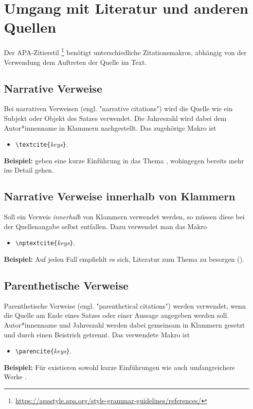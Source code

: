 \chapter[Umgang mit Literatur]{Umgang mit Literatur und anderen Quellen}
\label{cha:Literatur}

Der APA-Zitierstil%
\footnote{\url{https://apastyle.apa.org/style-grammar-guidelines/references/}}
benötigt unterschiedliche Zitationsmakros, abhängig von der Verwendung \bzw dem Auftreten der Quelle im Text.

\section{Narrative Verweise}

Bei narrativen Verweisen (engl. "narrative citations") wird die Quelle wie ein Subjekt oder Objekt des Satzes
verwendet. Die Jahreszahl wird dabei dem Autor*innenname in Klammern nachgestellt. Das zugehörige Makro ist
%
\begin{itemize}
\item[] \verb!\textcite{!\textit{keys}\verb!}!.
\end{itemize}
%
\textbf{Beispiel:}
\textcite{Daniel2018} geben eine kurze Einführung in das Thema \latex, wohingegen \textcite{Oetiker2018, Kopka2003}
bereits mehr ins Detail gehen.


\section{Narrative Verweise innerhalb von Klammern}

Soll ein Verweis \emph{innerhalb} von Klammern verwendet werden, so müssen diese bei der Quellenangabe
selbst entfallen. Dazu verwendet man das Makro 
%
\begin{itemize}
\item[] \verb!\nptextcite{!\textit{keys}\verb!}!.
\end{itemize}
%
\textbf{Beispiel:}
Auf jeden Fall empfiehlt es sich, Literatur zum Thema \latex zu besorgen (\zB {}).

\section{Parenthetische Verweise}

Parenthetische Verweise (engl. "parenthetical citations") werden verwendet, wenn die Quelle am
Ende eines Satzes oder einer Aussage angegeben werden soll. Autor*innen\-name und Jahreszahl
werden dabei gemeinsam in Klammern gesetzt und durch einen Beistrich getrennt.
Das verwendete Makro ist
%
\begin{itemize}
\item[] \verb!\parencite{!\textit{keys}\verb!}!.
\end{itemize}
%
\textbf{Beispiel:}
Für \latex existieren sowohl kurze Einführungen \parencite{Daniel2018} wie auch umfangreichere Werke 
\parencite{Oetiker2018, Kopka2003}.

